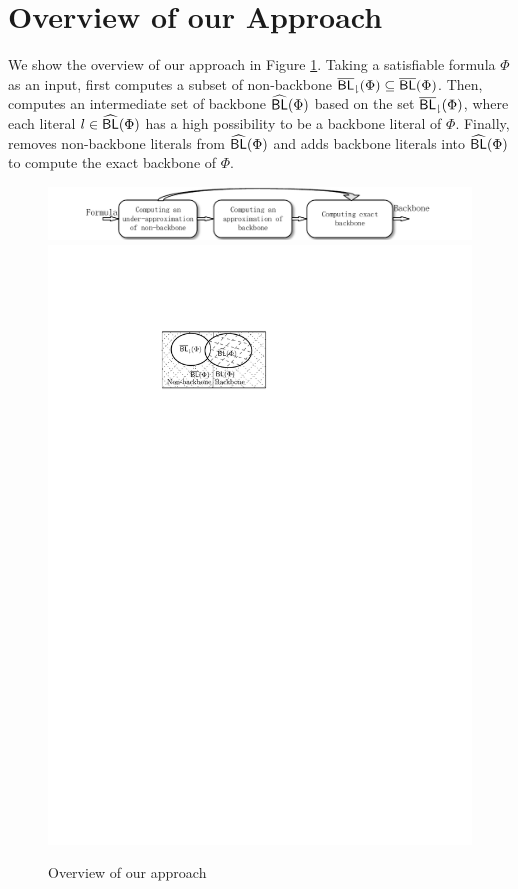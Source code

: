 \section{Overview of our Approach}\label{sec:overview}
We show the overview of our approach \tool in Figure \ref{flow}. Taking a satisfiable formula
$\Phi$ as an input, \tool first computes a subset of non-backbone ${\sf \overline{BL}_\downharpoonright}(\Phi)\subseteq \overline{\textsf{BL}}(\Phi)$. 
Then, \tool computes an intermediate set of backbone ${\sf \widehat{BL}}(\Phi)$ based on the set ${\sf \overline{BL}_\downharpoonright}(\Phi)$, where each literal $l\in {\sf \widehat{BL}}(\Phi)$ has a high possibility to be a backbone literal of $\Phi$.
Finally, \tool removes non-backbone literals from ${\sf \widehat{BL}}(\Phi)$ and adds backbone literals into ${\sf \widehat{BL}}(\Phi)$ to compute the exact backbone of $\Phi$.
\begin{figure}[t]
   \includegraphics[scale=0.75]{Framework}
  \hspace*{30mm} \includegraphics[scale=0.75]{Fig-backbone}
   \caption{Overview of our approach}
   \label{flow}
\end{figure}

